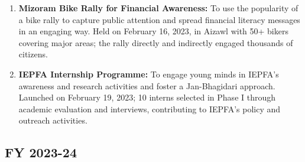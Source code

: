 \documentclass[openany]{book}
\begin{document}
\begin{enumerate}
    \item \textbf{Mizoram Bike Rally for Financial Awareness:} To use the popularity of a bike rally to capture public attention and spread financial literacy messages in an engaging way. Held on February 16, 2023, in Aizawl with 50+ bikers covering major areas; the rally directly and indirectly engaged thousands of citizens.
    \item \textbf{IEPFA Internship Programme:} To engage young minds in IEPFA's awareness and research activities and foster a Jan-Bhagidari approach. Launched on February 19, 2023; 10 interns selected in Phase I through academic evaluation and interviews, contributing to IEPFA's policy and outreach activities.
\end{enumerate}

\subsection{FY 2023-24}
\end{document}
